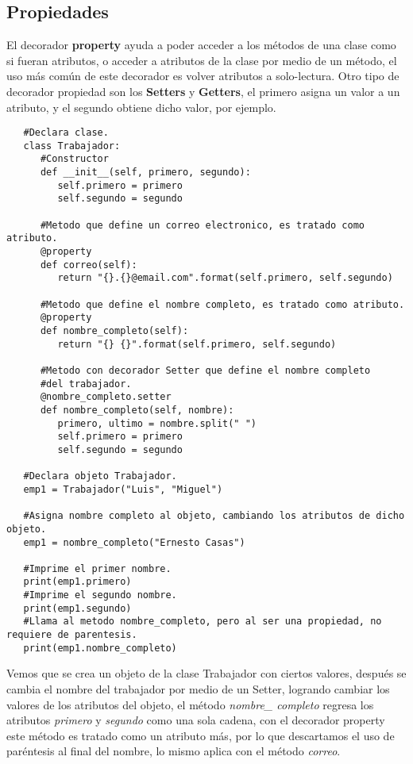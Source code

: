 \subsection{Propiedades}
\hspace{0.55cm}El decorador \textbf{property} ayuda a poder acceder a los métodos de una clase como si fueran atributos, o acceder a atributos de la clase por medio de un método, el uso más común de este decorador es volver atributos a solo-lectura. Otro tipo de decorador propiedad son los \textbf{Setters} y \textbf{Getters}, el primero asigna un valor a un atributo, y el segundo obtiene dicho valor, por ejemplo.
\begin{lstlisting}
   #Declara clase.
   class Trabajador:
      #Constructor
      def __init__(self, primero, segundo):
         self.primero = primero
         self.segundo = segundo
      
      #Metodo que define un correo electronico, es tratado como atributo.
      @property
      def correo(self):
         return "{}.{}@email.com".format(self.primero, self.segundo)
         
      #Metodo que define el nombre completo, es tratado como atributo.
      @property
      def nombre_completo(self):
         return "{} {}".format(self.primero, self.segundo)
         
      #Metodo con decorador Setter que define el nombre completo
      #del trabajador.
      @nombre_completo.setter
      def nombre_completo(self, nombre):
         primero, ultimo = nombre.split(" ")
         self.primero = primero
         self.segundo = segundo
         
   #Declara objeto Trabajador.
   emp1 = Trabajador("Luis", "Miguel")
   
   #Asigna nombre completo al objeto, cambiando los atributos de dicho objeto.
   emp1 = nombre_completo("Ernesto Casas")
   
   #Imprime el primer nombre.
   print(emp1.primero)
   #Imprime el segundo nombre.
   print(emp1.segundo)
   #Llama al metodo nombre_completo, pero al ser una propiedad, no requiere de parentesis.
   print(emp1.nombre_completo)
\end{lstlisting}

Vemos que se crea un objeto de la clase Trabajador con ciertos valores, después se cambia el nombre del trabajador por medio de un Setter, logrando cambiar los valores de los atributos del objeto, el método \textit{nombre\_ completo} regresa los atributos \textit{primero} y \textit{segundo} como una sola cadena, con el decorador property este método es tratado como un atributo más, por lo que descartamos el uso de paréntesis al final del nombre, lo mismo aplica con el método \textit{correo}.



